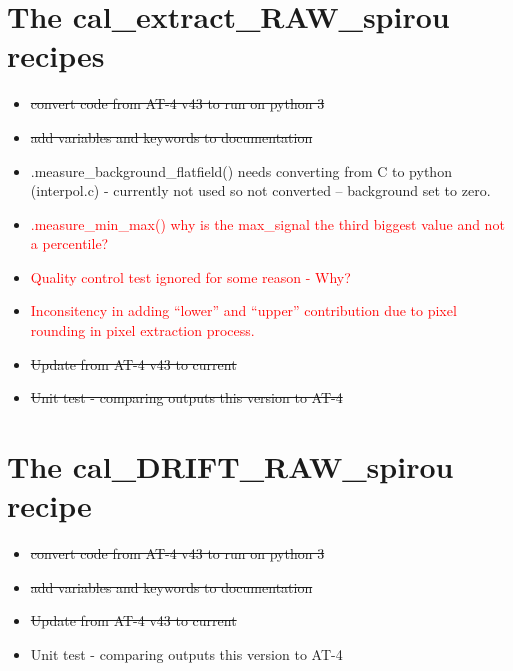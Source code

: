 \section{The cal\_extract\_RAW\_spirou recipes}
\label{ch:todo:cal_extract_RAW_spirou}

\begin{itemize}
	\item \sout{convert code from AT-4 v43 to run on python 3}
	\item \sout{add variables and keywords to documentation}
	\item \spirouBACK.measure\_background\_flatfield() needs converting from C to python (interpol.c) - currently not used so not converted -- background set to zero.
	\item \textcolor{red}{\spirouBACK.measure\_min\_max() why is the max\_signal the third biggest value and not a percentile?}
	\item \textcolor{red}{Quality control test  ignored for some reason - Why?}
	\item \textcolor{red}{Inconsitency in adding ``lower'' and ``upper'' contribution due to pixel rounding in pixel extraction process.}
	\item \sout{Update from AT-4 v43 to current}
	\item \sout{Unit test - comparing outputs this version to AT-4}
\end{itemize}

\section{The cal\_DRIFT\_RAW\_spirou recipe}
\label{ch:todo:cal_DRIFT_RAW_spirou}

\begin{itemize}
	\item \sout{convert code from AT-4 v43 to run on python 3}
	\item \sout{add variables and keywords to documentation}
	\item \sout{Update from AT-4 v43 to current}
	\item Unit test - comparing outputs this version to AT-4
\end{itemize}



